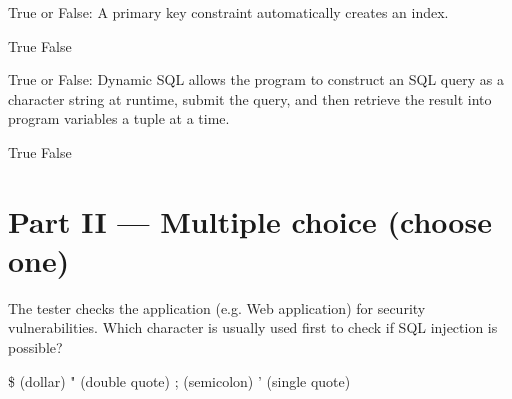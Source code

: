 \documentclass[12pt, addpoints, answers]{exam}
\begin{document}
\begin{questions}
\begin{minipage}{\linewidth}
\question[2]
True or False: A primary key constraint automatically creates an index.\par\vspace{0.5em}
\begin{checkboxes}
    \CorrectChoice True
    \choice False
\end{checkboxes}
\end{minipage}\vspace{1em}

\begin{minipage}{\linewidth}
\question[2]
True or False: Dynamic SQL allows the program to construct an SQL query as a character string at runtime, submit the query, 
and then retrieve the result into program variables a tuple at a time.\par\vspace{0.5em}
\begin{checkboxes}
    \CorrectChoice True
    \choice False
\end{checkboxes}
\end{minipage}\vspace{1em}


\section*{Part II — Multiple choice (choose one)}

\begin{minipage}{\linewidth}
\question[2]
The tester checks the application (e.g. Web application) for security vulnerabilities. 
Which character is usually used first to check if SQL injection is possible?\par\vspace{0.5em}
\begin{checkboxes} 
    \choice \$ (dollar)
    \choice " (double quote)
    \choice ; (semicolon)
    \CorrectChoice ' (single quote)
\end{checkboxes}
\end{minipage}\vspace{1em}


\end{questions}
\end{document}

